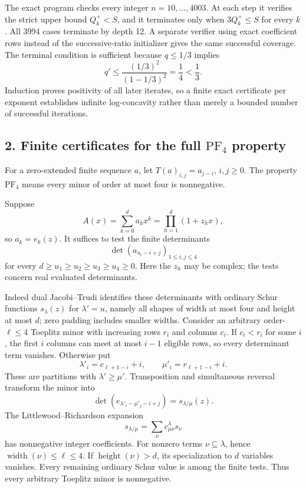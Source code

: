 \documentclass[
  11pt,
]{article}
\begin{document}
The exact program checks every integer \(n=10,\ldots,4003\). At each
step it verifies the strict upper bound \(Q_k^+<S\), and it terminates
only when \(3Q_k^+\le S\) for every \(k\). All 3994 cases terminate by
depth 12. A separate verifier using exact coefficient rows instead of
the successive-ratio initializer gives the same successful coverage. The
terminal condition is sufficient because \(q\le1/3\) implies \[
q'\le\frac{(1/3)^2}{(1-1/3)^2}=\frac14<\frac13.
\] Induction proves positivity of all later iterates, so a finite exact
certificate per exponent establishes infinite log-concavity rather than
merely a bounded number of successful iterations.

\subsection{\texorpdfstring{2. Finite certificates for the full
\(\mathrm{PF}_4\)
property}{2. Finite certificates for the full \textbackslash mathrm\{PF\}\_4 property}}\label{finite-certificates-for-the-full-mathrmpf_4-property}

For a zero-extended finite sequence \(a\), let \(T(a)_{i,j}=a_{j-i}\),
\(i,j\ge0\). The property \(\mathrm{PF}_4\) means every minor of order
at most four is nonnegative.

Suppose \[
A(x)=\sum_{k=0}^d a_kx^k=\prod_{h=1}^d(1+z_hx),
\] so \(a_k=e_k(z)\). It suffices to test the finite determinants \[
\det(a_{u_i-i+j})_{1\le i,j\le4}
\] for every \(d\ge u_1\ge u_2\ge u_3\ge u_4\ge0\). Here the \(z_h\) may
be complex; the tests concern real evaluated determinants.

Indeed dual Jacobi--Trudi identifies these determinants with ordinary
Schur functions \(s_\lambda(z)\) for \(\lambda'=u\), namely all shapes
of width at most four and height at most \(d\); zero padding includes
smaller widths. Consider an arbitrary order-\(\ell\le4\) Toeplitz minor
with increasing rows \(r_i\) and columns \(c_i\). If \(c_i<r_i\) for
some \(i\), the first \(i\) columns can meet at most \(i-1\) eligible
rows, so every determinant term vanishes. Otherwise put \[
\lambda'_i=c_{\ell+1-i}+i,\qquad \mu'_i=r_{\ell+1-i}+i.
\] These are partitions with \(\lambda'\ge\mu'\). Transposition and
simultaneous reversal transform the minor into \[
\det(e_{\lambda'_i-\mu'_j-i+j})=s_{\lambda/\mu}(z).
\] The Littlewood--Richardson expansion \[
s_{\lambda/\mu}=\sum_\nu c_{\mu\nu}^{\lambda}s_\nu
\] has nonnegative integer coefficients. For nonzero terms
\(\nu\subseteq\lambda\), hence \(\operatorname{width}(\nu)\le\ell\le4\).
If \(\operatorname{height}(\nu)>d\), its specialization to \(d\)
variables vanishes. Every remaining ordinary Schur value is among the
finite tests. Thus every arbitrary Toeplitz minor is nonnegative.
\end{document}
